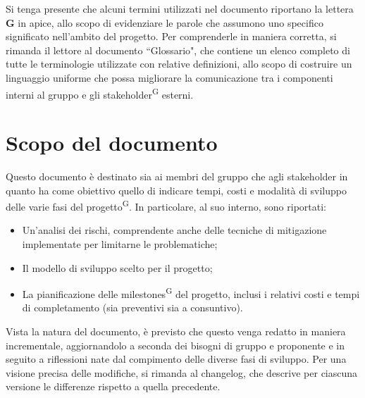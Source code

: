 \begin{beginningnote}
    Si tenga presente che alcuni termini utilizzati nel documento riportano la lettera \textbf{G} in apice, allo scopo di evidenziare le parole che assumono uno specifico significato nell'ambito del progetto. Per comprenderle in maniera corretta, si rimanda il lettore al documento ``Glossario", che contiene un elenco completo di tutte le terminologie utilizzate con relative definizioni, allo scopo di costruire un linguaggio uniforme che possa migliorare la comunicazione tra i componenti interni al gruppo e gli stakeholder\textsuperscript{G} esterni.
\end{beginningnote}

\section{Scopo del documento}\label{sec:scopo_del_documento}
Questo documento è destinato sia ai membri del gruppo che agli stakeholder in quanto ha come obiettivo quello di indicare tempi, costi e modalità di sviluppo delle varie fasi del progetto\textsuperscript{G}.
In particolare, al suo interno, sono riportati:
\begin{itemize}
    \item Un'analisi dei rischi, comprendente anche delle tecniche di mitigazione implementate per limitarne le problematiche;
    \item Il modello di sviluppo scelto per il progetto;
    \item La pianificazione delle milestones\textsuperscript{G} del progetto, inclusi i relativi costi e tempi di completamento (sia preventivi sia a consuntivo).
\end{itemize}
Vista la natura del documento, è previsto che questo venga redatto in maniera incrementale, aggiornandolo a seconda dei bisogni di gruppo e proponente e in seguito a riflessioni nate dal compimento delle diverse fasi di sviluppo. Per una visione precisa delle modifiche, si rimanda al changelog, che descrive per ciascuna versione le differenze rispetto a quella precedente.

